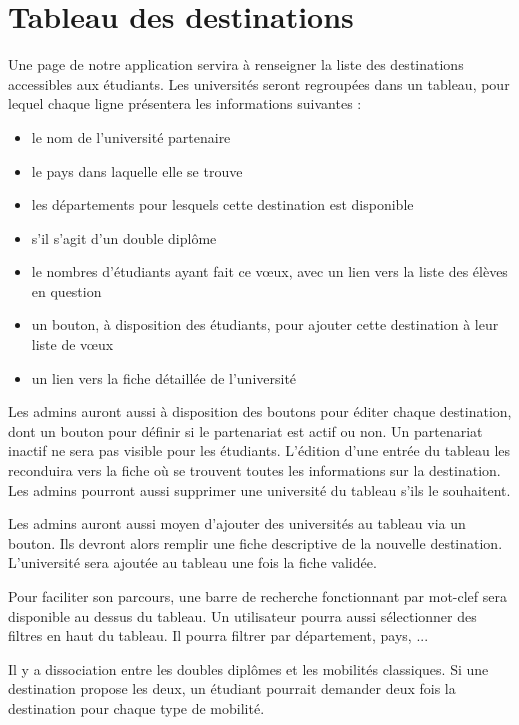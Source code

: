 \section{Tableau des destinations}
Une page de notre application servira à renseigner la liste des destinations accessibles aux étudiants.
Les universités seront regroupées dans un tableau, pour lequel chaque ligne présentera les informations suivantes :
 \begin{itemize}
 	\item le nom de l'université partenaire
 	\item le pays dans laquelle elle se trouve
 	\item les départements pour lesquels cette destination est disponible
 	\item s'il s'agit d'un double diplôme
 	\item le nombres d'étudiants ayant fait ce vœux, avec un lien vers la liste des élèves en question
 	\item un bouton, à disposition des étudiants, pour ajouter cette destination à leur liste de vœux
 	\item un lien vers la fiche détaillée de l'université
 \end{itemize}
 
 Les admins auront aussi à disposition des boutons pour éditer chaque destination, dont un bouton pour définir si le partenariat est actif ou non. Un partenariat inactif ne sera pas visible pour les étudiants.
 L'édition d'une entrée du tableau les reconduira vers la fiche où se trouvent toutes les informations sur la destination.
 Les admins pourront aussi supprimer une université du tableau s'ils le souhaitent.
 
 Les admins auront aussi moyen d'ajouter des universités au tableau via un bouton. Ils devront alors remplir une fiche descriptive de la nouvelle destination. L'université sera ajoutée au tableau une fois la fiche validée.
 
 Pour faciliter son parcours, une barre de recherche fonctionnant par mot-clef sera disponible au dessus du tableau. Un utilisateur pourra aussi sélectionner des filtres en haut du tableau. Il pourra filtrer par département, pays, ...
 
  Il y a dissociation entre les doubles diplômes et les mobilités classiques. Si une destination propose les deux, un étudiant pourrait demander deux fois la destination pour chaque type de mobilité.